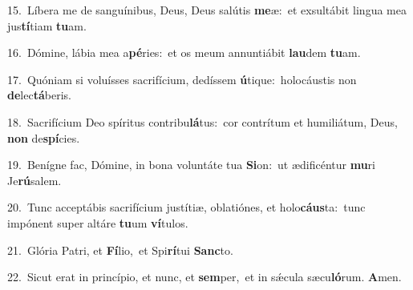 {\numbfont\textcolor{\numbcolor}{15.}}~Líbera me de sanguínibus, Deus, Deus salútis \textbf{me}\-æ:~\star et exsultábit lingua mea jus\-\textbf{tí}\-tiam \textbf{tu}\-am.\par
{\numbfont\textcolor{\numbcolor}{16.}}~Dómine, lábia mea a\-\textbf{pé}\-ries:~\star et os meum annuntiábit \textbf{lau}\-dem \textbf{tu}\-am.\par
{\numbfont\textcolor{\numbcolor}{17.}}~Quóniam si voluísses sacrifícium, dedíssem \textbf{ú}\-tique:~\star holocáustis non \textbf{de}\-lec\-\textbf{tá}\-beris.\par
{\numbfont\textcolor{\numbcolor}{18.}}~Sacrifícium Deo spíritus contribu\-\textbf{lá}\-tus:~\star cor contrítum et humiliátum, Deus, \textbf{non} de\-\textbf{spí}\-cies.\par
{\numbfont\textcolor{\numbcolor}{19.}}~Benígne fac, Dómine, in bona voluntáte tua \textbf{Si}\-on:~\star ut ædificéntur \textbf{mu}\-ri Je\-\textbf{rú}\-salem.\par
{\numbfont\textcolor{\numbcolor}{20.}}~Tunc acceptábis sacrifícium justítiæ, oblatiónes, et holo\-\textbf{cáus}\-ta:~\star tunc impónent super altáre \textbf{tu}\-um \textbf{ví}\-tulos.\par
{\numbfont\textcolor{\numbcolor}{21.}}~Glória Patri, et \textbf{Fí}\-lio,~\star et Spi\-\textbf{rí}\-tui \textbf{Sanc}\-to.\par
{\numbfont\textcolor{\numbcolor}{22.}}~Sicut erat in princípio, et nunc, et \textbf{sem}\-per,~\star et in sǽcula sæcu\-\textbf{ló}\-rum. \textbf{A}\-men.\par
